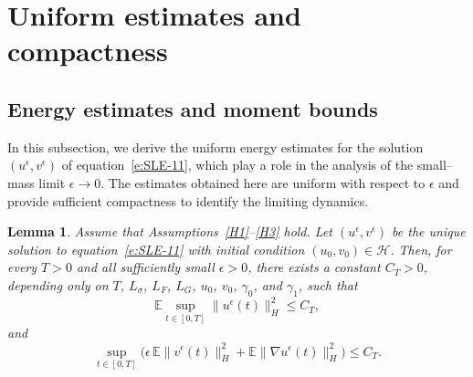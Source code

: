 \documentclass[11pt]{article}
\theoremstyle{plain}
\newtheorem{lemma}[theorem]{Lemma}
\numberwithin{equation}{section}
\begin{document}
\section{Uniform estimates and compactness}\label{sec:est}


\subsection{Energy estimates and moment bounds}
In this subsection, we derive  the uniform energy estimates for the solution $(u^\epsilon,v^\epsilon)$ of equation~\eqref{e:SLE-11}, which play a  role in the
analysis of the small--mass limit $\epsilon\to0$. The estimates obtained here are uniform with respect to $\epsilon$ and provide
sufficient compactness to identify the limiting dynamics.

\begin{lemma}\label{lemma1-33}
Assume that Assumptions~\ref{H1}--\ref{H3} hold.
Let $(u^{\epsilon},v^{\epsilon})$ be the unique solution to
equation~\eqref{e:SLE-11} with initial condition
$(u_0,v_0)\in\mathcal H$.
Then, for every $T>0$ and all sufficiently small $\epsilon>0$, there exists
a constant $C_T>0$, depending only on
$T$, $L_\sigma$, $L_F$, $L_G$, $u_0$, $v_0$, $\gamma_0$, and $\gamma_1$, such that
\begin{equation}\label{a-priori-u}
\mathbb E\sup_{t\in[0,T]}\|u^{\epsilon}(t)\|_H^2 \le C_T,
\end{equation}
and
\begin{equation}\label{a-priori-v}
\sup_{t\in[0,T]}
\Big(
\epsilon\,\mathbb E\|v^{\epsilon}(t)\|_H^2
+ \mathbb E\|\nabla u^{\epsilon}(t)\|_H^2
\Big)
\le C_T .
\end{equation}
\end{lemma}

 
\end{document}
